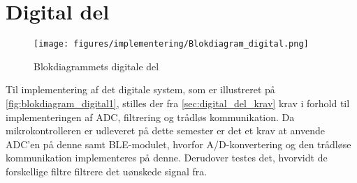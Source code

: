 \section{Digital del}

\begin{figure}[H]
\centering
\texttt{[image: figures/implementering/Blokdiagram\_digital.png]}
\caption{Blokdiagrammets digitale del}
\label{fig:blokdiagram_digital1}
\end{figure}

Til implementering af det digitale system, som er illustreret på \autoref{fig:blokdiagram_digital1}, stilles der fra \autoref{sec:digital_del_krav} krav i forhold til implementeringen af ADC, filtrering og trådløs kommunikation. Da mikrokontrolleren er udleveret på dette semester er det et krav at anvende ADC'en på denne samt BLE-modulet, hvorfor A/D-konvertering og den trådløse kommunikation implementeres på denne. Derudover testes det, hvorvidt de forskellige filtre filtrere det uønskede signal fra. 




